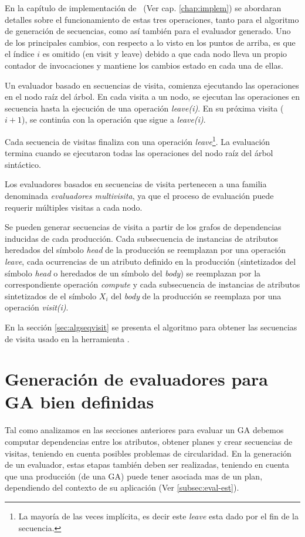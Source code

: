 En la capítulo de implementación de \maggen\ (Ver cap. \ref{chap:implem}) se abordaran detalles sobre el funcionamiento de estas tres operaciones, tanto para el algoritmo de generación de secuencias, como así también para el evaluador generado. Uno de los principales cambios, con respecto a lo visto en los puntos de arriba, es que el índice $i$ es omitido (en visit y leave) debido a que cada nodo lleva un propio contador de invocaciones y mantiene los cambios estado en cada una de ellas.  

Un evaluador basado en secuencias de visita, comienza ejecutando las operaciones en el nodo raíz del árbol. En cada visita a un nodo, se ejecutan las operaciones en secuencia hasta la ejecución de una operación \emph{leave(i)}.
En su próxima visita ($i+1$), se continúa con la operación que sigue a \emph{leave(i)}.

Cada secuencia de visitas finaliza con una operación \emph{leave}\footnote{La mayoría de las veces implícita, es decir este \emph{leave} esta dado por el fin de la secuencia.}. La evaluación termina cuando se ejecutaron todas las operaciones del nodo raíz del árbol
sintáctico.

Los evaluadores basados en secuencias de visita pertenecen a una familia denominada  \emph{evaluadores multivisita}, ya que el proceso de evaluación puede requerir múltiples visitas a cada nodo.

Se pueden generar secuencias de visita a partir de los grafos de dependencias inducidas de cada producción. Cada subsecuencia de instancias de atributos heredados del símbolo \textit{head} de la producción se reemplazan por una operación \emph{leave}, cada ocurrencias de un atributo definido en la producción (sintetizados del símbolo \textit{head} o heredados de un símbolo del \textit{body}) se reemplazan por la correspondiente operación \emph{compute} y cada subsecuencia de instancias de atributos sintetizados de el símbolo $X_i$ del \textit{body} de la producción se reemplaza por una  operación \emph{visit(i)}.

En la sección \ref{sec:algseqvisit} se presenta el algoritmo para obtener las secuencias de visita usado en la herramienta \maggen.

\section{Generación de evaluadores para GA bien definidas}

Tal como analizamos en las secciones anteriores para evaluar un GA debemos computar dependencias entre los atributos, obtener planes y crear secuencias de visitas, teniendo en cuenta posibles problemas de circularidad. En la generación de un evaluador, estas etapas también deben ser realizadas, teniendo en cuenta que una producción (de una GA) puede tener asociada mas de un plan, dependiendo del contexto de su aplicación (Ver \ref{subsec:eval-est}). 

